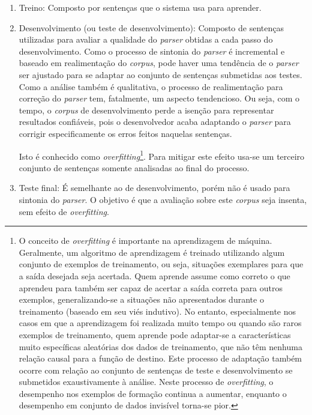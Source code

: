 \begin{enumerate}

\item{Treino: Composto por sentenças que o sistema usa para aprender.} %
\label{sub:treino}

\item{Desenvolvimento (ou teste de desenvolvimento): Composto de sentenças utilizadas para avaliar a qualidade do \emph{parser} obtidas a cada passo do desenvolvimento. Como o processo de sintonia do \emph{parser} é incremental e baseado em realimentação do \emph{corpus}, pode haver uma tendência de o \emph{parser} ser ajustado para se adaptar ao conjunto de sentenças submetidas aos testes. Como a análise também é qualitativa, o processo de realimentação para correção do \emph{parser} tem, fatalmente, um aspecto tendencioso. Ou seja, com o tempo, o \emph{corpus} de desenvolvimento perde a isenção para representar resultados confiáveis, pois o desenvolvedor acaba adaptando o \emph{parser} para corrigir especificamente os erros feitos naquelas sentenças. 

Isto é conhecido como \emph{overfitting}\footnote{O conceito de \emph{overfitting} \cite{everitt2002cambridge} é importante na aprendizagem de máquina. Geralmente, um algoritmo de aprendizagem é treinado utilizando algum conjunto de exemplos de treinamento, ou seja, situações exemplares para que a saída desejada seja acertada. Quem aprende assume como correto o que aprendeu para também ser capaz de acertar a saída correta para outros exemplos, generalizando-se a situações não apresentados durante o treinamento (baseado em seu viés indutivo). No entanto, especialmente nos casos em que a aprendizagem foi realizada muito tempo ou quando são raros exemplos de treinamento, quem aprende pode adaptar-se a características muito específicas aleatórias dos dados de treinamento, que não têm nenhuma relação causal para a função de destino. Este processo de adaptação também ocorre com relação ao conjunto de sentenças de teste e desenvolvimento se submetidos exaustivamente à análise. Neste processo de \emph{overfitting}, o desempenho nos exemplos de formação continua a aumentar, enquanto o desempenho em conjunto de dados invisível torna-se pior.}. Para mitigar este efeito usa-se um terceiro conjunto de sentenças somente analisadas ao final do processo.} 

\label{sub:desenvolvimento_ou_teste_de_desenvolvimento_}

\item{Teste final: É semelhante ao de desenvolvimento, porém não é usado para sintonia do \emph{parser}. O objetivo é que a avaliação sobre este \emph{corpus} seja insenta, sem efeito de \emph{overfitting}.}
\label{sub:teste_final}
\end{enumerate}

